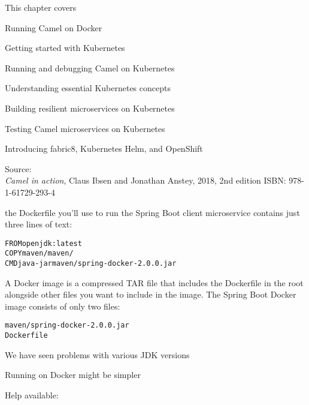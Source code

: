 \documentclass[Screen16to9,17pt]{foils}
\begin{document}
\begin{list2}
  \item {}
\end{list2}




This chapter covers
\begin{list2}
\item Running Camel on Docker
\item Getting started with Kubernetes
\item Running and debugging Camel on Kubernetes
\item Understanding essential Kubernetes concepts
\item Building resilient microservices on Kubernetes
\item Testing Camel microservices on Kubernetes
\item Introducing fabric8, Kubernetes Helm, and OpenShift
\end{list2}

Source: {\footnotesize\\
\emph{Camel in action}, Claus Ibsen and Jonathan Anstey, 2018, 2nd edition
ISBN: 978-1-61729-293-4}






  the Dockerfile you’ll use to run the Spring Boot client microservice contains
  just three lines of text:
\begin{alltt}
  FROM openjdk:latest
  COPY maven /maven/
  CMD java -jar maven/spring-­docker-2.0.0.jar
\end{alltt}

  A Docker image is a compressed TAR file that includes the Dockerfile in the root
  alongside other files you want to include in the image. The Spring Boot Docker image
  consists of only two files:
\begin{alltt}
  maven/spring-­docker-2.0.0.jar
  Dockerfile
\end{alltt}

\begin{list2}
  \item We have seen problems with various JDK versions
  \item Running on Docker might be simpler
  \item Help available: {\footnotesize{}}
\end{list2}
\end{document}
